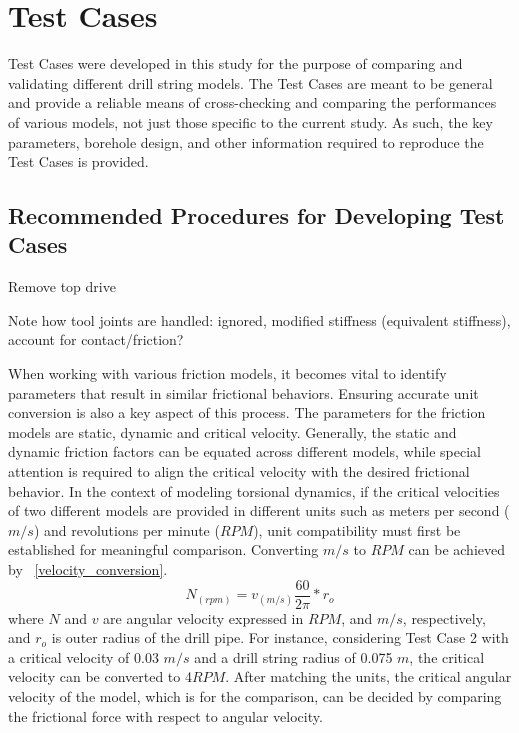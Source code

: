 \chapter{Test Cases}
\label{ch:testcases}
Test Cases were developed in this study for the purpose of comparing and validating different drill string models.  The Test Cases are meant to be general and provide a reliable means of cross-checking and comparing the performances of various models, not just those specific to the current study.  As such, the key parameters, borehole design, and other information required to reproduce the Test Cases is provided.

\section{Recommended Procedures for Developing Test Cases}
\begin{bulletedlist}
	\item Remove top drive
	\item Note how tool joints are handled: ignored, modified stiffness (equivalent stiffness), account for contact/friction?
\end{bulletedlist}
\notfinished{}
When working with various friction models, it becomes vital to identify parameters that result in similar frictional behaviors. Ensuring accurate unit conversion is also a key aspect of this process. The parameters for the friction models are static, dynamic and critical velocity. Generally, the static and dynamic friction factors can be equated across different models, while special attention is required to align the critical velocity with the desired frictional behavior. In the context of modeling torsional dynamics, if the critical velocities of two different models are provided in different units such as meters per second ($m/s$) and revolutions per minute ($RPM$), unit compatibility must first be established for meaningful comparison. Converting $m/s$ to $RPM$ can be achieved by \equationname~\ref{velocity_conversion}.
\begin{equation}\label{velocity_conversion}
  N_{(rpm)}=v_{(m/s)}\frac{60}{2\pi}*r_o
\end{equation}
where $N$ and $v$ are angular velocity expressed in $RPM$, and $m/s$, respectively, and $r_o$ is outer radius of the drill pipe. For instance, considering Test Case 2 with a critical velocity of 0.03 $m/s$ and a drill string radius of 0.075 $m$, the critical velocity can be converted to 4$RPM$. After matching the units, the critical angular velocity of the model, which is for the comparison, can be decided by comparing the frictional force with respect to angular velocity.

